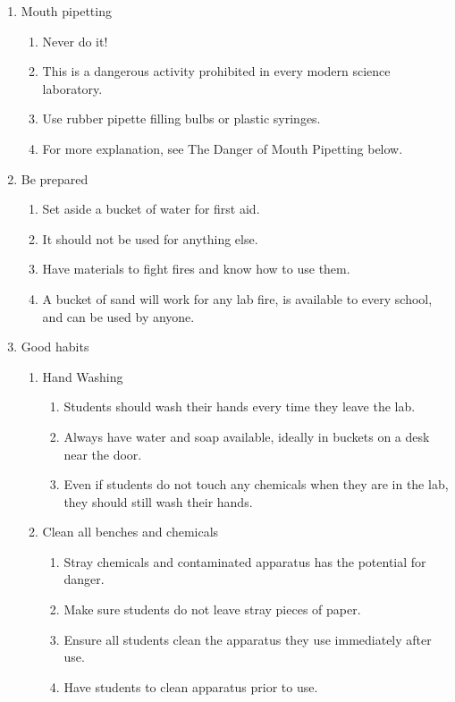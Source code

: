 \begin{enumerate}
\begin{enumerate}
\begin{enumerate}
{move everything away from him/her 
and then let the body finish moving on its own.}
\end{enumerate}
\end{enumerate}
\item{Mouth pipetting}
\begin{enumerate}
\item{Never do it!}
\item{This is a dangerous activity 
prohibited in every modern science laboratory.}
\item{Use rubber pipette filling bulbs or plastic syringes.}
\item{For more explanation, see The Danger of Mouth Pipetting below.}
\end{enumerate}
\item{Be prepared}
\begin{enumerate}
\item{Set aside a bucket of water for first aid.}
\item{It should not be used for anything else.}
\item{Have materials to fight fires and know how to use them.}
\item{A bucket of sand will work for any lab fire, 
is available to every school, and can be used by anyone.}
\end{enumerate}
\item{Good habits}
\begin{enumerate}
\item{Hand Washing}
\begin{enumerate}
\item{Students should wash their hands every time they leave the lab.}
\item{Always have water and soap available, 
ideally in buckets on a desk near the door.}
\item{Even if students do not touch any chemicals when they are in the lab, 
they should still wash their hands. }
\end{enumerate}
\item{Clean all benches and chemicals}
\begin{enumerate}
\item{Stray chemicals and contaminated apparatus has the potential for danger.}
\item{Make sure students do not leave stray pieces of paper.}
\item{Ensure all students clean the apparatus they use immediately after use.}
\item{Have students to clean apparatus prior to use. 
}
\end{enumerate}
\end{enumerate}
\end{enumerate}
